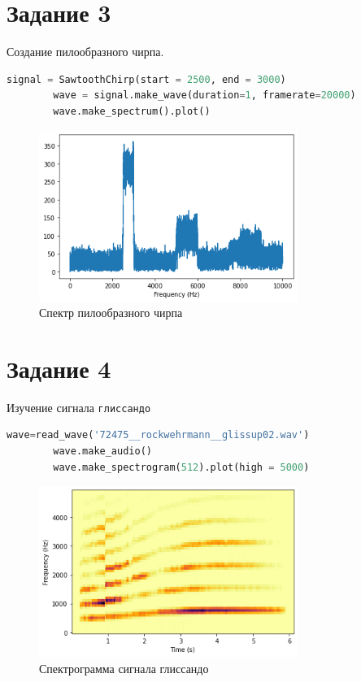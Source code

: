 \documentclass[a4paper, 12pt]{report}
\begin{document}
	\section{Задание 3}
	Создание пилообразного чирпа.
	\begin{lstlisting}[language=Python,caption=Пилообразный чирп]
		signal = SawtoothChirp(start = 2500, end = 3000)
		wave = signal.make_wave(duration=1, framerate=20000)
		wave.make_spectrum().plot()
	\end{lstlisting}
	\begin{figure}[H]
		\centering
		\includegraphics[width=0.75\textwidth]{chirp6.png}
		\caption{Спектр пилообразного чирпа}
		\label{fig:chirp6}
	\end{figure}	

	\section{Задание 4}
	Изучение сигнала \texttt{глиссандо}
	\begin{lstlisting}[language=Python,caption=Получение сигнала]
		wave=read_wave('72475__rockwehrmann__glissup02.wav')
		wave.make_audio()
		wave.make_spectrogram(512).plot(high = 5000)
	\end{lstlisting}
	\begin{figure}[H]
		\centering
		\includegraphics[width=0.75\textwidth]{glis1.png}
		\caption{Спектрограмма сигнала глиссандо}
		\label{fig:glis1}
	\end{figure}
	
\end{document}
